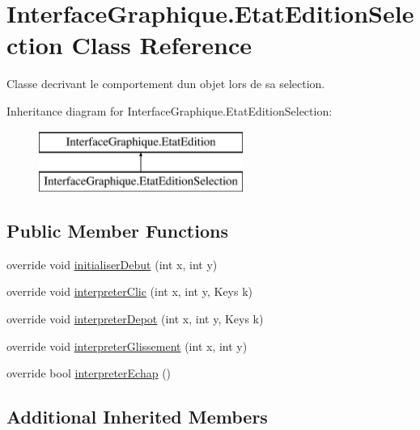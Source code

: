\hypertarget{class_interface_graphique_1_1_etat_edition_selection}{}\section{Interface\+Graphique.\+Etat\+Edition\+Selection Class Reference}
\label{class_interface_graphique_1_1_etat_edition_selection}


Classe decrivant le comportement d\textquotesingle{}un objet lors de sa selection.  


Inheritance diagram for Interface\+Graphique.\+Etat\+Edition\+Selection\+:\begin{figure}[H]
\begin{center}
\leavevmode
\includegraphics[height=2.000000cm]{class_interface_graphique_1_1_etat_edition_selection}
\end{center}
\end{figure}
\subsection*{Public Member Functions}
\begin{DoxyCompactItemize}
\item 
override void \hyperlink{group__inf2990_ga8a2180a8469534f3e433b38171a01997}{initialiser\+Debut} (int x, int y)
\item 
override void \hyperlink{group__inf2990_gad79f5a52db7e3a5c284e14757e123959}{interpreter\+Clic} (int x, int y, Keys k)
\item 
override void \hyperlink{group__inf2990_gaf541d3e99c5c6aa6ba426b5c4837a2e1}{interpreter\+Depot} (int x, int y, Keys k)
\item 
override void \hyperlink{group__inf2990_ga7c967ae93f9be63db88d8a4396376b2a}{interpreter\+Glissement} (int x, int y)
\item 
override bool \hyperlink{group__inf2990_ga1d5501534ab93b45feb5f5fb8b82e7ea}{interpreter\+Echap} ()
\end{DoxyCompactItemize}
\subsection*{Additional Inherited Members}


